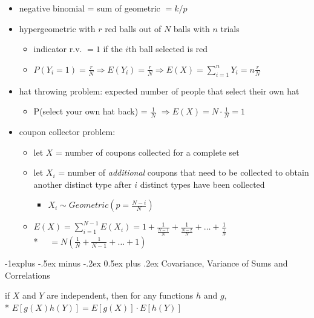 \documentclass[10pt, landscape]{article}
\makeatletter
\renewcommand{\subsection}{\@startsection{subsection}{2}{0mm}%
  {-1explus -.5ex minus -.2ex}%
  {0.5ex plus .2ex}%
{\normalfont\normalsize\bfseries}}
\makeatother
\begin{document}
\begin{multicols*}{3}
  \begin{itemize}
    \item negative binomial = sum of geometric $= k/p$
    \item hypergeometric with $r$ red balls out of  $N$ balls  with $n$ trials
      \begin{itemize}
        \item indicator r.v. $=1$ if the $i$th ball selected is red \item $P(Y_i = 1) = \frac{r}{N} \Rightarrow E(Y_i) = \frac{r}{N} \Rightarrow E(X) = \sum^n_{i=1}Y_i = n\frac{r}{N} $
      \end{itemize}
    \item hat throwing problem: expected number of people that select their own hat
      \begin{itemize}
        \item P(select your own hat back) = $\frac{1}{N}$ $\Rightarrow E(X) = N \cdot \frac{1}{N} = 1$
      \end{itemize}
    \item coupon collector problem: 
      \begin{itemize}
        \item let $X$ = number of coupons collected for a complete set
        \item let $X_i$ = number of \textit{additional} coupons that need to be collected to obtain another distinct type after $i$ distinct types have been collected 
          \begin{itemize}
            \item $X_i \sim Geometric(p = \frac{N-i}{N} )$
          \end{itemize}
        \item $E(X) = \sum^{N-1}_{i=1} E(X_i) = 1 + \frac{1}{\frac{N-1}{N}} + \frac{1}{\frac{N-2}{N}} + \dots + \frac{1}{\frac{1}{N}}$ 
          \\* $ \quad = N(\frac{1}{N} + \frac{1}{N-1} + \dots + 1) $
      \end{itemize}
  \end{itemize}

  \subsection{Covariance, Variance of Sums and Correlations}

  \begin{tightcenter}
    if $X$ and $Y$ are independent, then for any functions $h$ and $g$, 
    \\* $E[ g(X) h(Y) ] = E[g(X)] \cdot E[h(Y)] $
  \end{tightcenter}


\end{multicols*}
\end{document}
